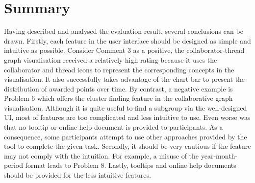 \section{Summary}
Having described and analysed the evaluation result, several conclusions can be drawn. Firstly, each feature in the user interface should be designed as simple and intuitive as possible. Consider Comment 3 as a positive, the collaborator-thread graph visualisation received a relatively high rating because it uses the collaborator and thread icons to represent the corresponding concepts in the visualisation. It also successfully takes advantage of the chart bar to present the distribution of awarded points over time. By contrast, a negative example is Problem 6 which offers the cluster finding feature in the collaborative graph visualisation. Although it is quite useful to find a subgroup via the well-designed UI, most of features are too complicated and less intuitive to use. Even worse was that no tooltip or online help document is provided to participants. As a consequence, some participants attempt to use other approaches provided by the tool to complete the given task. Secondly, it should be very cautious if the feature may not comply with the intuition. For example, a misuse of the year-month-period format leads to Problem 8. Lastly, tooltips and online help documents should be provided for the less intuitive features. 
